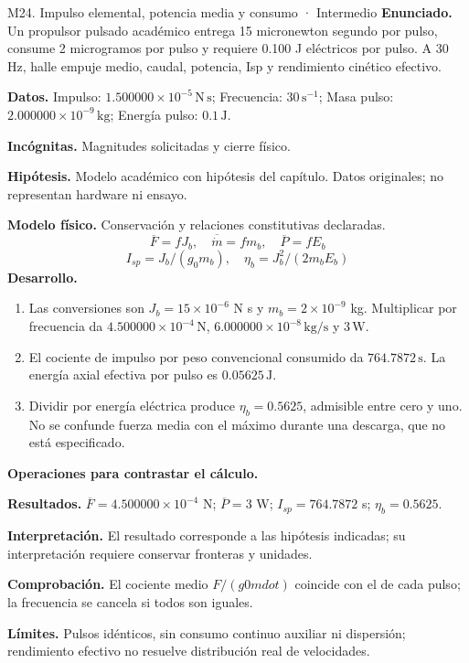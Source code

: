 \begin{studiumworked}{M24. Impulso elemental, potencia media y consumo · Intermedio}
\textbf{Enunciado.} Un propulsor pulsado académico entrega 15 micronewton segundo por pulso, consume 2 microgramos por pulso y requiere 0.100 J eléctricos por pulso. A 30 Hz, halle empuje medio, caudal, potencia, Isp y rendimiento cinético efectivo.

\textbf{Datos.} Impulso: $1.500000\times10^{-5}\,\mathrm{N\,s}$; Frecuencia: $30\,\mathrm{s^{-1}}$; Masa pulso: $2.000000\times10^{-9}\,\mathrm{kg}$; Energía pulso: $0.1\,\mathrm{J}$.

\textbf{Incógnitas.} Magnitudes solicitadas y cierre físico.

\textbf{Hipótesis.} Modelo académico con hipótesis del capítulo. Datos originales; no representan hardware ni ensayo.

\textbf{Modelo físico.} Conservación y relaciones constitutivas declaradas.
\[\overline F=fJ_b,\quad\overline{\dot m}=fm_b,\quad\overline P=fE_b\]
\[I_{sp}=J_b/(g_0m_b),\quad\eta_b=J_b^2/(2m_bE_b)\]
\textbf{Desarrollo.}
\begin{enumerate}
\item Las conversiones son $J_b=15\times10^{-6}$ N s y $m_b=2\times10^{-9}$ kg. Multiplicar por frecuencia da $4.500000\times10^{-4}\,\mathrm{N}$, $6.000000\times10^{-8}\,\mathrm{kg/s}$ y $3\,\mathrm{W}$.
\item El cociente de impulso por peso convencional consumido da $764.7872\,\mathrm{s}$. La energía axial efectiva por pulso es $0.05625\,\mathrm{J}$.
\item Dividir por energía eléctrica produce $\eta_b=0.5625$, admisible entre cero y uno. No se confunde fuerza media con el máximo durante una descarga, que no está especificado.
\end{enumerate}
\textbf{Operaciones para contrastar el cálculo.}

\textbf{Resultados.} $\overline F=4.500000\times10^{-4}$ N; $\overline P=3$ W; $I_{sp}=764.7872$ s; $\eta_b=0.5625$.

\textbf{Interpretación.} El resultado corresponde a las hipótesis indicadas; su interpretación requiere conservar fronteras y unidades.

\textbf{Comprobación.} El cociente medio $F/(g0 mdot)$ coincide con el de cada pulso; la frecuencia se cancela si todos son iguales.

\textbf{Límites.} Pulsos idénticos, sin consumo continuo auxiliar ni dispersión; rendimiento efectivo no resuelve distribución real de velocidades.
\end{studiumworked}
